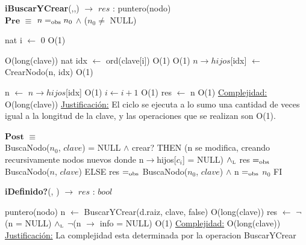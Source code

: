 \begin{algorithm}[H]{\textbf{iBuscarYCrear}(,,) $\to$ $res$ : puntero(nodo)}
	{\\ $\textbf{Pre}$ $\equiv$ $n =_{\mathrm{obs}} n_0$ $\land$ ($n_0 \neq$ NULL)  }
	\begin{algorithmic}[1]
		\State nat i $\gets$ 0  									\Comment O(1)

		 	\Comment O(long(clave)) 
			\State nat idx $\gets$ ord(clave[i])								\Comment O(1)
			 		\Comment O(1)
				\State $n \rightarrow hijos$[idx] $\gets$ CrearNodo(n, idx)		\Comment O(1)
			\EndIf	
					
			\State n $\gets$ $n \rightarrow hijos$[idx]		\Comment O(1)
			\State $i \gets i + 1$ 											\Comment O(1)
		\EndWhile
		\State res $\gets$ n					\Comment O(1)
		\medskip
		\Statex \underline{Complejidad:} O(long(clave))
		\Statex \underline{Justificación:} El ciclo se ejecuta a lo sumo una cantidad de veces igual a la longitud de la clave, y las operaciones que se realizan son O(1).
    \end{algorithmic}
    {$\textbf{Post}$ $\equiv$ \\
     \IF BuscaNodo($n_0$, $clave$) = NULL $\land$ crear? THEN   
     (n se modifica, creando recursivamente nodos nuevos donde n$\rightarrow$hijos[$c_i$] = NULL) $\land_{\mathrm{\scriptscriptstyle{L}}}$
    	res $=_{\mathrm{obs}}$ BuscaNodo($n$, $clave$) 
     ELSE 
     res $=_{\mathrm{obs}}$ BuscaNodo($n_0$, $clave$) $\land$ n $=_{\mathrm{obs}}$ $n_0$ 
     FI }
\end{algorithm}


    



\begin{algorithm}[H]{\textbf{iDefinido?}(, ) $\to$ $res$ : $bool$}
	\begin{algorithmic}[1]
		\State puntero(nodo) n $\gets$ BuscarYCrear(d.raiz, clave, false)     \Comment O(long(clave))
		\State res $\gets$ $\lnot$(n = NULL) $\land_{\mathrm{\scriptscriptstyle{L}}}$ $\lnot$(n $\rightarrow$ info = NULL)  \Comment O(1)
		\medskip
		\Statex \underline{Complejidad:} O(long(clave))
		\Statex \underline{Justificación:} La complejidad esta determinada por la operacion BuscarYCrear
    \end{algorithmic}
\end{algorithm}


